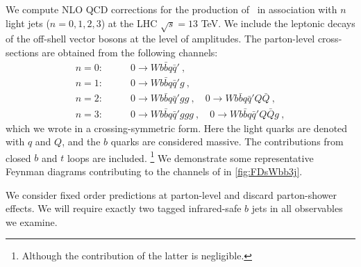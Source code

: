 We compute NLO QCD corrections for the production of \Wbb~in association with $n$ light jets ($n =
0,1,2,3$) at the LHC $\sqrt{s} = 13$ TeV. 
We include the leptonic decays of the off-shell vector bosons at the level of amplitudes.
The parton-level cross-sections are obtained from the following channels:
\begin{subequations}
  \begin{align}
    n=0:&\qquad 0\rightarrow Wb{\bar b}q{\bar q}'\ ,\\
    n=1:&\qquad 0\rightarrow Wb{\bar b}q{\bar q}'g\ ,\\
    n=2:&\qquad 0\rightarrow Wb{\bar b}q{\bar q}'gg\ ,\quad  0\rightarrow Wb{\bar b}q{\bar q}'Q{\bar Q}\ ,\\
    n=3:&\qquad 0\rightarrow Wb{\bar b}q{\bar q}'ggg\ ,\quad  0\rightarrow Wb{\bar b}q{\bar q}'Q{\bar Q}g\ ,
  \end{align}
\end{subequations}
which we wrote in a crossing-symmetric form. 
Here the light quarks are denoted with $q$ and $Q$, and the $b$ quarks are considered massive.
The contributions from closed $b$ and $t$ loops are included. \footnote{
  Although the contribution of the latter is negligible.
}
We demonstrate some representative Feynman diagrams contributing to the channels of \Wbbjjj{} in \cref{fig:FDsWbb3j}.

We consider fixed order predictions at parton-level and discard parton-shower
effects. We will require exactly two tagged infrared-safe $b$ jets \cite{Banfi:2006hf}
in all observables we examine.

